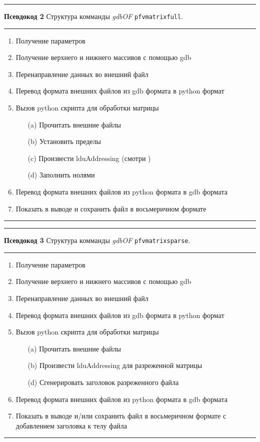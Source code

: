 \documentclass[a4paper,10pt]{book}
\begin{document}
\vspace{2 mm}
\hrule\smallskip
\textbf{Псевдокод 2} Структура комманды \textit{gdbOF} \texttt{pfvmatrixfull}.
\smallskip\hrule
\vspace{2 mm}
\small {\begin{enumerate}
        \item Получение параметров
	\item Получение верхнего и нижнего массивов с помощью gdb
	\item Перенаправление данных во внешний файл
	\item Перевод формата внешних файлов из gdb формата в python формат
	\item Вызов python скрипта для обработки матрицы
	\begin{enumerate}
		\item[(a)] Прочитать внешние файлы
		\item[(b)] Установить пределы
		\item[(c)] Произвести lduAddressing (смотри )
		\item[(d)] Заполнить нолями
	\end{enumerate}
	\item Перевод формата внешних файлов из python формата в gdb формата
	\item Показать в выводе и сохранить файл в восьмеричном формате
        \end{enumerate}
} 
\vspace{2 mm}
\smallskip\hrule
\vspace{5 mm}


\vspace{2 mm}
\hrule\smallskip
\textbf{Псевдокод 3} Структура комманды \textit{gdbOF} \texttt{pfvmatrixsparse}.
\smallskip\hrule
\vspace{2 mm}
\small {\begin{enumerate}
        \item Получение параметров
	\item Получение верхнего и нижнего массивов с помощью gdb
	\item Перенаправление данных во внешний файл
	\item Перевод формата внешних файлов из gdb формата в python формат
	\item Вызов python скрипта для обработки матрицы
	\begin{enumerate}
		\item[(a)] Прочитать внешние файлы
		\item[(b)] Произвести lduAddressing для разреженной матрицы
		\item[(d)] Сгенерировать заголовок разреженного файла
	\end{enumerate}
	\item Перевод формата внешних файлов из python формата в gdb формата
	\item Показать в выводе и/или сохранить файл в восьмеричном формате с добавлением заголовка к телу файла
        \end{enumerate}
} 
\vspace{2 mm}
\smallskip\hrule
\vspace{5 mm}
\end{document}
